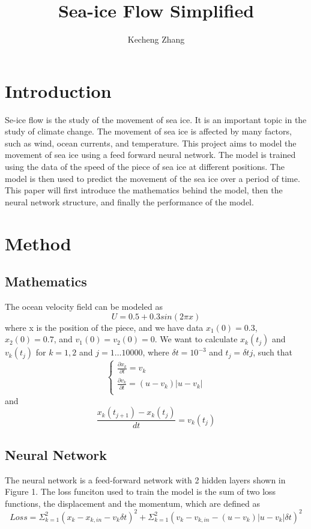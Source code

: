 \documentclass[12pt, a4paper]{article}
\begin{document}
\title{Sea-ice Flow Simplified}
\author{Kecheng Zhang}
\maketitle


\section{Introduction}
Se-ice flow is the study of the movement of sea ice. It is an important topic in the study of climate change. The movement of sea ice is affected by many factors, such as wind, ocean currents, and temperature.
This project aims to model the movement of sea ice using a feed forward neural network. The model is trained using the data of the speed of the piece of sea ice at different positions. The model is then used to predict the movement of the sea ice over a period of time.
This paper will first introduce the mathematics behind the model, then the neural network structure, and finally the performance of the model.
\section{Method}

\subsection{Mathematics}
The ocean velocity field can be modeled as
$$ U = 0.5 + 0.3sin(2 \pi x) $$
where x is the position of the piece, and we have data
$x_1(0) = 0.3$, $x_2(0) = 0.7$, and $v_1(0) = v_2(0) = 0$.
We want to calculate
$x_k(t_j)$ and $v_k(t_j)$ for $k = 1, 2$ and $j = 1\dots10000$, where
$\delta t = 10^{-3}$ and $t_j = \delta t j$, such that
$$\begin{cases}
    \frac{\partial x_k}{\partial t} = v_k\\
    \frac{\partial v_k}{\partial t} = (u - v_k) |u - v_k|\\
    \end{cases}$$
and $$ \frac{x_k(t_{j+1}) - x_k(t_j)}{dt} = v_k(t_j)$$

\subsection{Neural Network}
The neural network is a feed-forward network with 2 hidden layers shown in Figure 1. The loss funciton used to train the model is the sum of two loss functions, the displacement and the momentum, which are defined as
$$Loss = \Sigma^2_{k=1}(x_k - x_{k,in} - v_k\delta t)^2 + \Sigma^2_{k=1}(v_k - v_{k,in} - (u - v_k) |u - v_k|\delta t)^2$$
\end{document}
